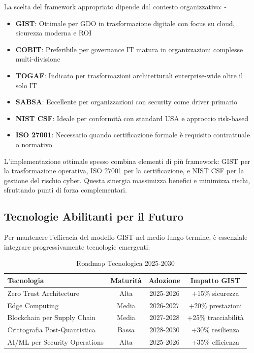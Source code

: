 La scelta del framework appropriato dipende dal contesto organizzativo: - \begin{itemize}
    \item \textbf{GIST}: Ottimale per GDO in trasformazione digitale con focus
    su cloud, sicurezza moderna e ROI
    \item \textbf{COBIT}: Preferibile per governance IT matura in organizzazioni complesse multi-divisione
    \item \textbf{TOGAF}: Indicato per trasformazioni architetturali enterprise-wide oltre il solo IT
    \item \textbf{SABSA}: Eccellente per organizzazioni con security come driver primario
    \item \textbf{NIST CSF}: Ideale per conformità con standard USA e approccio risk-based 
    \item \textbf{ISO 27001}: Necessario quando certificazione formale è
    requisito contrattuale o normativo
\end{itemize}
L’implementazione ottimale spesso combina elementi di più framework: GIST per la trasformazione operativa, ISO 27001 per la certificazione, e NIST CSF per la gestione del rischio cyber. Questa sinergia massimizza benefici e minimizza rischi, sfruttando punti di forza complementari.

\subsection{\texorpdfstring{Tecnologie Abilitanti per il Futuro}{5.6.2 - Tecnologie Abilitanti per il Futuro}}
\label{subsec:5.6.2}

Per mantenere l'efficacia del modello GIST nel medio-lungo termine, è essenziale integrare progressivamente tecnologie emergenti:

\begin{table}[h!]
\centering
\caption{Roadmap Tecnologica 2025-2030}
\label{tab:tech_roadmap}
\begin{tabular}{|l|c|c|c|}
\hline
\textbf{Tecnologia} & \textbf{Maturità} & \textbf{Adozione} & \textbf{Impatto GIST} \\
\hline
Zero Trust Architecture & Alta & 2025-2026 & +15\% sicurezza \\
Edge Computing & Media & 2026-2027 & +20\% prestazioni \\
Blockchain per Supply Chain & Media & 2027-2028 & +25\% tracciabilità \\
Crittografia Post-Quantistica & Bassa & 2028-2030 & +30\% resilienza \\
AI/ML per Security Operations & Alta & 2025-2026 & +35\% efficienza \\
\hline
\end{tabular}
\end{table}

